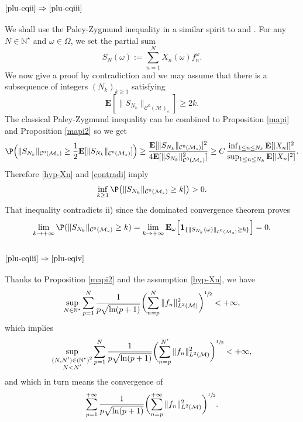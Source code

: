 \documentclass[JEP,XML,SOM,Unicode,NoEqCountersInSection,published]{cedram}
\theoremstyle{theorem}
\theoremstyle{definition}
\newcommand\E{\mathbf{E}}
\newcommand\N{\mathbb{N}}
\newcommand\CC{\mathcal{C}}
\newcommand\pun{\mathbf{1}}
\begin{document}
\subsubsection*{$\eqref{plu-eqii}\Rightarrow\eqref{plu-eqiii}$}
We shall use the Paley-Zygmund inequality in a similar spirit to
\cite[p.\,55, Lem.\,1.2]{pisier1981} and \cite[Prop.\,2.17]{imek-crusep}. For any $N\in \N^\star$ and $\omega\in \Omega$, we set the partial sum
\begin{equation*}
S_N(\omega):=\sum_{n=1}^N X_n(\omega) f_n^{\omega}.
\end{equation*}
We now give a proof by contradiction and we may assume that there is a subsequence of integers $(N_k)_{k\geq 1}$ satisfying
\begin{equation}\label{contradi}
\E[\|S_{N_k}\|_{\CC^0(\mathcal{M})_s}]\geq 2k.
\end{equation}
The classical Paley-Zygmund inequality \cite[p.\,8, Ineq.\,II]{kahane} can be combined to Proposition \ref{mapi} and Proposition \ref{mapi2} so we get
\begin{equation*}
\P\Big(\|S_{N_k}\|_{\CC^0(\mathcal{M}_s)} \geq \frac{1}{2} \E[\|S_{N_k}\|_{\CC^0(\mathcal{M}_s)}]\Big)\geq \frac{\E[\|S_{N_k}\|_{\CC^0(\mathcal{M}_s)}]^2}{4
\E[\|S_{N_k}\|_{\CC^0(\mathcal{M}_s)}^2]} \geq C\,\frac{\inf_{1\leq n\leq N_k}\E[|X_n|]^2}{\sup_{1\leq n \leq N_k} \E[|X_n|^2] }.
\end{equation*}
Therefore \eqref{hyp-Xn} and \eqref{contradi} imply
\begin{equation*}
\inf_{k\geq 1} \P\bigl(\|S_{N_k}\|_{\CC^0(\mathcal{M}_s)} \geq k]\bigr)>0.
\end{equation*}
That inequality contradicts ii) since the dominated convergence theorem proves
\begin{equation*}
\lim_{k\to +\infty} \P(\|S_{N_k} \|_{\CC^0(\mathcal{M}_s)}\geq k)=\lim_{k\to +\infty} \E_{\omega}\Big[\pun_{\{\|S_{N_k}(\omega) \|_{\CC^0(\mathcal{M}_s)}\geq k\}}\Big]=0.
\end{equation*}

\subsubsection*{$\eqref{plu-eqiii}\Rightarrow\eqref{plu-eqiv}$}
Thanks to Proposition \ref{mapi2} and the assumption \eqref{hyp-Xn}, we have
\begin{equation*}
\sup_{N\in \N^\star} \sum_{p=1}^N \frac{1}{p\sqrt{\ln(p+1)}} \biggl(\sum_{n=p}^{N} \|f_n\|_{L^2(\mathcal{M})}^2 \biggr)^{\sfrac{1}{2}}<+\infty,
\end{equation*}
which implies
\begin{equation*}
\sup_{\substack{(N,N')\in (\N^\star)^2 \\ N<N' }} \sum_{p=1}^{N} \frac{1}{p\sqrt{\ln(p+1)}} \biggl(\sum_{n=p}^{N'} \|f_n\|_{L^2(\mathcal{M})}^2 \biggr)^{\sfrac{1}{2}} <+\infty,
\end{equation*}
and which in turn means the convergence of
\[
\sum_{p=1}^{+\infty} \frac{1}{p\sqrt{\ln(p+1)}} \biggl(\sum_{n=p}^{+\infty} \|f_n\|_{L^2(\mathcal{M})}^2 \biggr)^{\sfrac{1}{2}}.
\]
\end{document}
